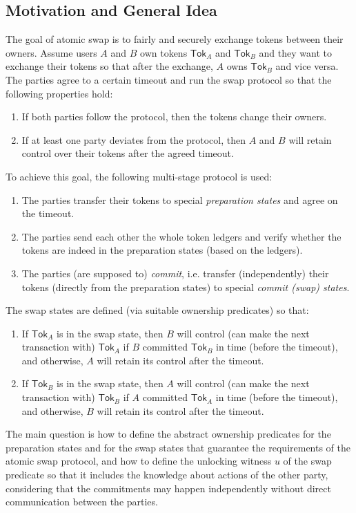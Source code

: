 \documentclass{article}
\begin{document}
\subsection{Motivation and General Idea}
The goal of atomic swap is to fairly and securely exchange tokens between their owners. Assume users $A$ and $B$ own tokens $\mathsf{Tok}_A$ and $\mathsf{Tok}_B$ and they want to exchange their tokens so that after the exchange, $A$ owns $\mathsf{Tok}_B$ and vice versa. The parties agree to a certain timeout and run the swap protocol so that the following properties hold:
\begin{enumerate}
\item If both parties follow the protocol, then the tokens change their owners.
\item If at least one party deviates from the protocol, then $A$ and $B$ will retain control over their tokens after the agreed timeout.
\end{enumerate}
To achieve this goal, the following multi-stage protocol is used:
\begin{enumerate}
\item The parties transfer their tokens to special \emph{preparation states} and agree on the timeout.
\item The parties send each other the whole token ledgers and verify whether the tokens are indeed in the preparation states (based on the ledgers).
\item The parties (are supposed to) \emph{commit}, i.e. transfer (independently) their tokens (directly from the preparation states) to special \emph{commit (swap) states}.
\end{enumerate}
The swap states are defined (via suitable ownership predicates) so that:
\begin{enumerate}
\item If $\mathsf{Tok}_A$ is in the swap state, then $B$ will control (can make the next transaction with) $\mathsf{Tok}_A$ if $B$ committed $\mathsf{Tok}_B$ in time (before the timeout), and otherwise, $A$ will retain its control after the timeout.
\item If $\mathsf{Tok}_B$ is in the swap state, then $A$ will control (can make the next transaction with) $\mathsf{Tok}_B$ if $A$ committed $\mathsf{Tok}_A$ in time (before the timeout), and otherwise, $B$ will retain its control after the timeout.
\end{enumerate}
The main question is how to define the abstract ownership predicates for the preparation states and for the swap states that guarantee the requirements of the atomic swap protocol, and how to define the unlocking witness $u$ of the swap predicate so that it includes the knowledge about actions of the other party, considering that the commitments may happen independently without direct communication between the parties.
\end{document}
